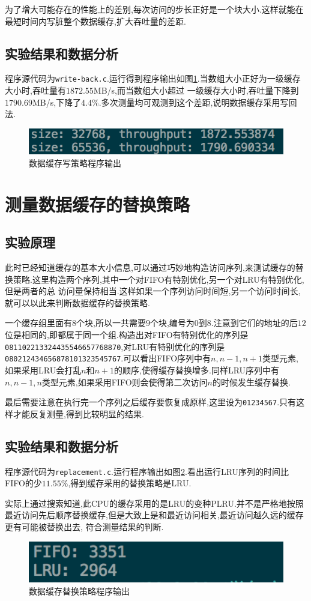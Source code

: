 \documentclass[adobefonts, nocap]{ctexart}
\begin{document}
      为了增大可能存在的性能上的差别,每次访问的步长正好是一个块大小.这样就能在最短时间内写脏整个数据缓存,扩大吞吐量的差距.
    \subsection{实验结果和数据分析}
      程序源代码为\texttt{write-back.c}.运行得到程序输出如图\ref{fig7}.当数组大小正好为一级缓存大小时,吞吐量有$1872.55$MB/s,而当数组大小超过
      一级缓存大小时,吞吐量下降到$1790.69$MB/s,下降了$4.4\%$.多次测量均可观测到这个差距,说明数据缓存采用写回法.

      \begin{figure}[htbp]
        \includegraphics[width=12cm]{7.png}
        \caption{数据缓存写策略程序输出}
        \label{fig7}
      \end{figure}
  \section{测量数据缓存的替换策略}
    \subsection{实验原理}
      此时已经知道缓存的基本大小信息,可以通过巧妙地构造访问序列,来测试缓存的替换策略.这里构造两个序列,其中一个对FIFO有特别优化,另一个对LRU有特别优化,但是两者的总
      访问量保持相当.这样如果一个序列访问时间短,另一个访问时间长,就可以以此来判断数据缓存的替换策略.

      一个缓存组里面有$8$个块,所以一共需要$9$个块,编号为$0$到$8$.注意到它们的地址的后$12$位是相同的,即都属于同一个组.构造出对FIFO有特别优化的序列是\texttt{081102213324435546657768870},对LRU有特别优化的序列是\texttt{080212434656878101323545767}.可以看出FIFO序列中有$n,n-1,n+1$类型元素,
      如果采用LRU会打乱$n$和$n+1$的顺序,使得缓存替换增多.同样LRU序列中有$n,n-1,n$类型元素,如果采用FIFO则会使得第二次访问$n$的时候发生缓存替换.

      最后需要注意在执行完一个序列之后缓存要恢复成原样,这里设为\texttt{01234567}.只有这样才能反复测量,得到比较明显的结果.
    \subsection{实验结果和数据分析}
      程序源代码为\texttt{replacement.c}.运行程序输出如图\ref{fig8}.看出运行LRU序列的时间比FIFO的少$11.55\%$,得到缓存采用的替换策略是LRU.

      实际上通过搜索知道,此CPU的缓存采用的是LRU的变种PLRU.并不是严格地按照最近访问先后顺序替换缓存,但是大致上是和最近访问相关,最近访问越久远的缓存更有可能被替换出去,
      符合测量结果的判断.

      \begin{figure}[htbp]
        \includegraphics[width=12cm]{8.png}
        \caption{数据缓存替换策略程序输出}
        \label{fig8}
      \end{figure}
\end{document}
